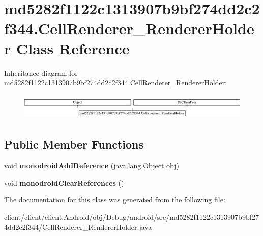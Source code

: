 \hypertarget{classmd5282f1122c1313907b9bf274dd2c2f344_1_1CellRenderer__RendererHolder}{}\section{md5282f1122c1313907b9bf274dd2c2f344.\+Cell\+Renderer\+\_\+\+Renderer\+Holder Class Reference}
\label{classmd5282f1122c1313907b9bf274dd2c2f344_1_1CellRenderer__RendererHolder}
Inheritance diagram for md5282f1122c1313907b9bf274dd2c2f344.\+Cell\+Renderer\+\_\+\+Renderer\+Holder\+:\begin{figure}[H]
\begin{center}
\leavevmode
\includegraphics[height=1.287356cm]{classmd5282f1122c1313907b9bf274dd2c2f344_1_1CellRenderer__RendererHolder}
\end{center}
\end{figure}
\subsection*{Public Member Functions}
\begin{DoxyCompactItemize}
\item 
\hypertarget{classmd5282f1122c1313907b9bf274dd2c2f344_1_1CellRenderer__RendererHolder_a26e3802b8b8eddd5848eb9c590a914ed}{}void {\bfseries monodroid\+Add\+Reference} (java.\+lang.\+Object obj)\label{classmd5282f1122c1313907b9bf274dd2c2f344_1_1CellRenderer__RendererHolder_a26e3802b8b8eddd5848eb9c590a914ed}

\item 
\hypertarget{classmd5282f1122c1313907b9bf274dd2c2f344_1_1CellRenderer__RendererHolder_a82604a9eb7717f98710ed6a8a1dfaaae}{}void {\bfseries monodroid\+Clear\+References} ()\label{classmd5282f1122c1313907b9bf274dd2c2f344_1_1CellRenderer__RendererHolder_a82604a9eb7717f98710ed6a8a1dfaaae}

\end{DoxyCompactItemize}


The documentation for this class was generated from the following file\+:\begin{DoxyCompactItemize}
\item 
client/client/client.\+Android/obj/\+Debug/android/src/md5282f1122c1313907b9bf274dd2c2f344/Cell\+Renderer\+\_\+\+Renderer\+Holder.\+java\end{DoxyCompactItemize}
